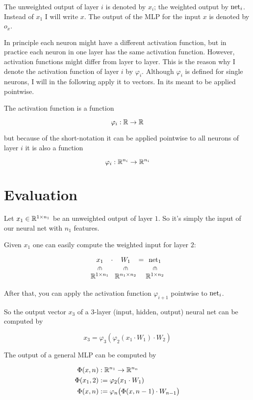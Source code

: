 The unweighted output of layer $i$ is denoted by $x_i$; the weighted output
by $\mathrm{net}_i$. Instead of $x_1$ I will write $x$.
The output of the \gls{MLP} for the input $x$ is denoted by $o_x$.

In principle each neuron might have a different activation function, but in
practice each neuron in one layer has the same activation function. However,
activation functions might differ from layer to layer. This is the reason why
I denote the activation function of layer $i$ by $\varphi_i$. Although $\varphi_i$
is defined for single neurons, I will in the following apply it to vectors. In
its meant to be applied pointwise.

The activation function is a function 

\[\varphi_i: \mathbb{R} \rightarrow \mathbb{R} \]

but because of the short-notation it can be applied pointwise to all neurons
of layer $i$ it is also a function

\[\varphi_i: \mathbb{R}^{n_{i}} \rightarrow \mathbb{R}^{n_{i}}\]

\section{Evaluation}
Let $x_1 \in \mathbb{R}^{1 \times n_1}$ be an unweighted output of layer $1$. So it's
simply the input of our neural net with $n_1$ features.

Given $x_1$ one can easily compute the weighted input for layer $2$:

\[
\begin{array}{@{}c@{\;}c@{\;}c@{\;}c@{\;}c@{}}
x_1 & \cdot & W_{1} & = & \net_1 \\
\vin && \vin && \vin \\
\mathbb{R}^{1\times n_1} && \mathbb{R}^{n_1\times n_2} && \mathbb{R}^{1\times n_2}
\end{array}
\]

After that, you can apply the activation function $\varphi_{i+1}$ pointwise
to $\mathrm{net}_i$. %

So the output vector $x_3$ of a 3-layer (input, hidden, output) neural net can be
computed by

\[x_3 = \varphi_3(\varphi_2(x_1 \cdot W_{1}) \cdot W_{2})\]

The output of a general \gls{MLP} can be computed by

\begin{align*}
    \Phi(x, n) &: \mathbb{R}^{n_1} \rightarrow \mathbb{R}^{n_n}\\
    \Phi(x_1, 2) &:= \varphi_{2}(x_1 \cdot W_{1})\\
    \Phi(x, n) &:= \varphi_{n} \big (\Phi(x, n-1) \cdot W_{n-1} \big)
\end{align*}

